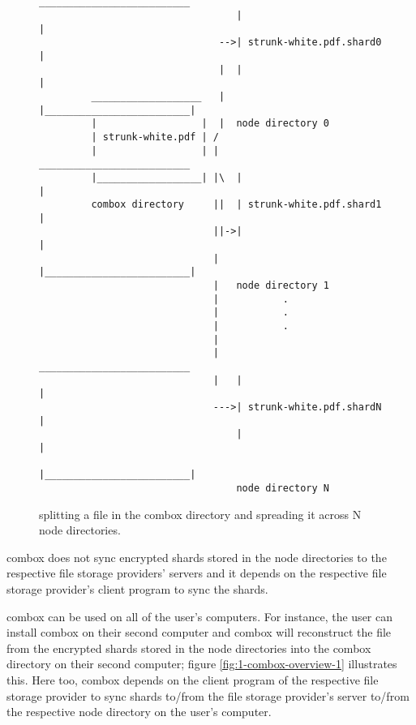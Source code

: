 \begin{figure}[h]
\begin{verbatim}

                                  __________________________
                                  |                         |
                               -->| strunk-white.pdf.shard0 |
                               |  |                         |
         ___________________   |  |_________________________|
         |                  |  |  node directory 0
         | strunk-white.pdf | /
         |                  | |   __________________________
         |__________________| |\  |                         |
         combox directory     ||  | strunk-white.pdf.shard1 |
                              ||->|                         |
                              |   |_________________________|
                              |   node directory 1
                              |           .
                              |           .
                              |           .
                              |
                              |   __________________________
                              |   |                         |
                              --->| strunk-white.pdf.shardN |
                                  |                         |
                                  |_________________________|
                                  node directory N
\end{verbatim}
  \caption{splitting a file in the combox directory and spreading it
    across N node directories.}
\label{fig:1-combox-overview-0}
\end{figure}

combox does not sync encrypted shards stored in the node directories
to the respective file storage providers' servers and it depends on the
respective file storage provider's client program to sync the
shards.

combox can be used on all of the user's computers. For instance, the
user can install combox on their second computer and combox will
reconstruct the file from the encrypted shards stored in the node
directories into the combox directory on their second computer; figure
\ref{fig:1-combox-overview-1} illustrates this. Here too, combox
depends on the client program of the respective file storage provider
to sync shards to/from the file storage provider's server to/from the
respective node directory on the user's computer.

